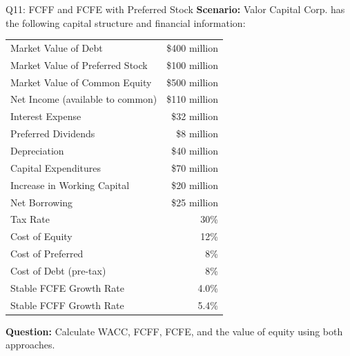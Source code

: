 \documentclass{beamer}
\renewcommand{\scriptsize}{\fontsize{6pt}{7pt}\selectfont}
\begin{document}
	\begin{frame}{Q11: FCFF and FCFE with Preferred Stock}
		\scriptsize
		\textbf{Scenario:} Valor Capital Corp. has the following capital structure and financial information:
		
		\begin{tabular}{lr}
			Market Value of Debt & \$400 million \\
			Market Value of Preferred Stock & \$100 million \\
			Market Value of Common Equity & \$500 million \\
			Net Income (available to common) & \$110 million \\
			Interest Expense & \$32 million \\
			Preferred Dividends & \$8 million \\
			Depreciation & \$40 million \\
			Capital Expenditures & \$70 million \\
			Increase in Working Capital & \$20 million \\
			Net Borrowing & \$25 million \\
			Tax Rate & 30\% \\
			Cost of Equity & 12\% \\
			Cost of Preferred & 8\% \\
			Cost of Debt (pre-tax) & 8\% \\
			Stable FCFE Growth Rate & 4.0\% \\
			Stable FCFF Growth Rate & 5.4\% \\
		\end{tabular}
		
		\textbf{Question:} Calculate WACC, FCFF, FCFE, and the value of equity using both approaches.
	\end{frame}
	
\end{document}
